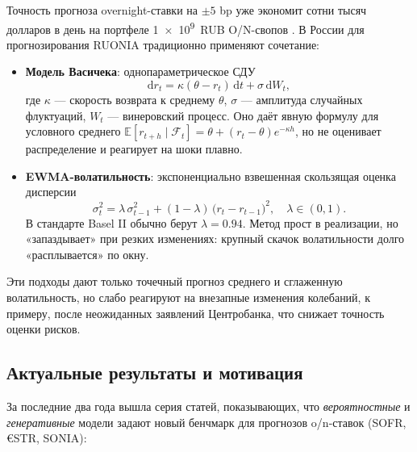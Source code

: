 Точность прогноза overnight-ставки на $\pm5$ bp уже экономит сотни тысяч долларов в день
на портфеле \SI{1e9}{RUB} O/N-свопов
\autocite{duffie2023onn}.  В России для прогнозирования RUONIA традиционно применяют сочетание:

\begin{itemize}
  \item \textbf{Модель Васичека}:  
    однопараметрическое СДУ
    \[
      \mathrm{d}r_t = \kappa(\theta - r_t)\,\mathrm{d}t + \sigma\,\mathrm{d}W_t,
    \]
    где 
    \(\kappa\) — скорость возврата к среднему \(\theta\), 
    \(\sigma\) — амплитуда случайных флуктуаций, 
    \(W_t\) — винеровский процесс.  
    Оно даёт явную формулу для условного среднего
    \(\displaystyle \mathbb{E}[r_{t+h}\mid \mathcal F_t] = \theta + (r_t-\theta)e^{-\kappa h}\),
    но не оценивает распределение и реагирует на шоки плавно.
  \item \textbf{EWMA-волатильность}:  
    экспоненциально взвешенная скользящая оценка дисперсии
    \[
      \sigma_t^2 = \lambda\,\sigma_{t-1}^2 + (1-\lambda)\,\bigl(r_t - r_{t-1}\bigr)^2,
      \quad \lambda\in(0,1).
    \]
    В стандарте Basel II обычно берут \(\lambda=0.94\).  
    Метод прост в реализации, но «запаздывает» при резких изменениях:
    крупный скачок волатильности долго «расплывается» по окну.
\end{itemize}

Эти подходы дают только точечный прогноз среднего и сглаженную
волатильность, но слабо реагируют на внезапные изменения колебаний, к примеру,
после неожиданных заявлений Центробанка, что снижает точность оценки
рисков.  


\subsection{Актуальные результаты и мотивация}

За последние два года вышла серия статей, показывающих, что
\emph{вероятностные} и \emph{генеративные} модели задают новый
бенчмарк для прогнозов o/n-ставок (SOFR, €STR, SONIA):

